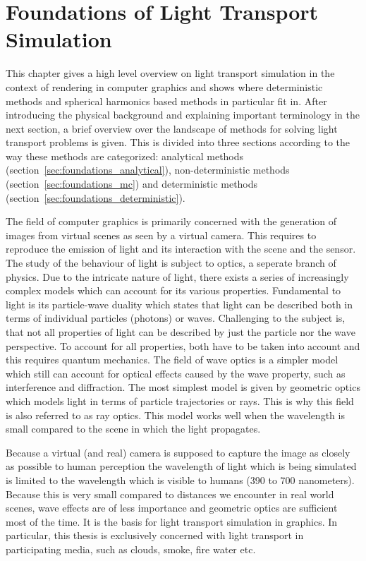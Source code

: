\chapter{Foundations of Light Transport Simulation}
\label{sec:foundations}

This chapter gives a high level overview on light transport simulation in the context of rendering in computer graphics and shows where deterministic methods and spherical harmonics based methods in particular fit in. After introducing the physical background and explaining important terminology in the next section, a brief overview over the landscape of methods for solving light transport problems is given. This is divided into three sections according to the way these methods are categorized: analytical methods (section~\ref{sec:foundations_analytical}), non-deterministic methods (section~\ref{sec:foundations_mc}) and deterministic methods (section~\ref{sec:foundations_deterministic}).

The field of computer graphics is primarily concerned with the generation of images from virtual scenes as seen by a virtual camera. This requires to reproduce the emission of light and its interaction with the scene and the sensor. The study of the behaviour of light is subject to optics, a seperate branch of physics. Due to the intricate nature of light, there exists a series of increasingly complex models which can account for its various properties. Fundamental to light is its particle-wave duality which states that light can be described both in terms of individual particles (photons) or waves. Challenging to the subject is, that not all properties of light can be described by just the particle nor the wave perspective. To account for all properties, both have to be taken into account and this requires quantum mechanics. The field of wave optics is a simpler model which still can account for optical effects caused by the wave property, such as interference and diffraction. The most simplest model is given by geometric optics which models light in terms of particle trajectories or rays. This is why this field is also referred to as ray optics. This model works well when the wavelength is small compared to the scene in which the light propagates. 

Because a virtual (and real) camera is supposed to capture the image as closely as possible to human perception the wavelength of light which is being simulated is limited to the wavelength which is visible to humans (390 to 700 nanometers). Because this is very small compared to distances we encounter in real world scenes, wave effects are of less importance and geometric optics are sufficient most of the time. It is the basis for light transport simulation in graphics. In particular, this thesis is exclusively concerned with light transport in participating media, such as clouds, smoke, fire water etc. 


